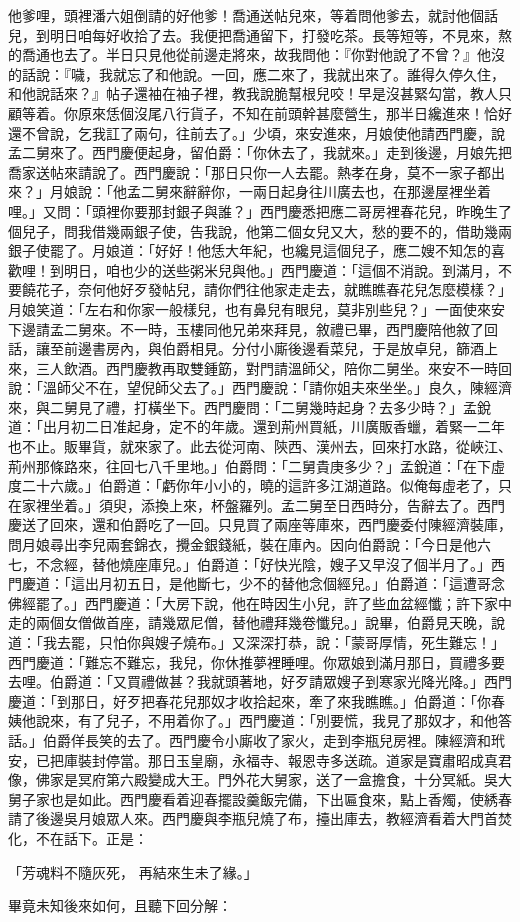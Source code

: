 \begin{showcontents}{}
他爹哩，頭裡潘六姐倒請的好他爹！喬通送帖兒來，等着問他爹去，就討他個話兒，到明日咱每好收拾了去。我便把喬通留下，打發吃茶。長等短等，不見來，熬的喬通也去了。半日只見他從前邊走將來，故我問他：『你對他說了不曾？』他沒的話說：『噦，我就忘了和他說。一回，應二來了，我就出來了。誰得久停久住，和他說話來？』帖子還袖在袖子裡，教我說脆幫根兒咬！早是沒甚緊勾當，教人只顧等着。你原來恁個沒尾八行貨子，不知在前頭幹甚麼營生，那半日纔進來！恰好還不曾說，乞我訌了兩句，往前去了。」少頃，來安進來，月娘使他請西門慶，說孟二舅來了。西門慶便起身，留伯爵：「你休去了，我就來。」走到後邊，月娘先把喬家送帖來請說了。西門慶說：「那日只你一人去罷。熱孝在身，莫不一家子都出來？」月娘說：「他孟二舅來辭辭你，一兩日起身往川廣去也，在那邊屋裡坐着哩。」又問：「頭裡你要那封銀子與誰？」西門慶悉把應二哥房裡春花兒，昨晚生了個兒子，問我借幾兩銀子使，告我說，他第二個女兒又大，愁的要不的，借助幾兩銀子使罷了。月娘道：「好好！他恁大年紀，也纔見這個兒子，應二嫂不知怎的喜歡哩！到明日，咱也少的送些粥米兒與他。」西門慶道：「這個不消說。到滿月，不要饒花子，奈何他好歹發帖兒，請你們往他家走走去，就瞧瞧春花兒怎麼模樣？」月娘笑道：「左右和你家一般樣兒，也有鼻兒有眼兒，莫非別些兒？」一面使來安下邊請孟二舅來。不一時，玉樓同他兄弟來拜見，敘禮已畢，西門慶陪他敘了回話，讓至前邊書房內，與伯爵相見。分付小廝後邊看菜兒，于是放卓兒，篩酒上來，三人飲酒。西門慶教再取雙鍾筯，對門請溫師父，陪你二舅坐。來安不一時回說：「溫師父不在，望倪師父去了。」西門慶說：「請你姐夫來坐坐。」良久，陳經濟來，與二舅見了禮，打橫坐下。西門慶問：「二舅幾時起身？去多少時？」孟銳道：「出月初二日准起身，定不的年歲。還到荊州買紙，川廣販香蠟，着緊一二年也不止。販畢貨，就來家了。此去從河南、陝西、漢州去，回來打水路，從峽江、荊州那條路來，往回七八千里地。」伯爵問：「二舅貴庚多少？」孟銳道：「在下虛度二十六歲。」伯爵道：「虧你年小小的，曉的這許多江湖道路。似俺每虛老了，只在家裡坐着。」須臾，添換上來，杯盤羅列。孟二舅至日西時分，告辭去了。西門慶送了回來，還和伯爵吃了一回。只見買了兩座等庫來，西門慶委付陳經濟裝庫，問月娘尋出李兒兩套錦衣，攪金銀錢紙，裝在庫內。因向伯爵說：「今日是他六七，不念經，替他燒座庫兒。」伯爵道：「好快光陰，嫂子又早沒了個半月了。」西門慶道：「這出月初五日，是他斷七，少不的替他念個經兒。」伯爵道：「這遭哥念佛經罷了。」西門慶道：「大房下說，他在時因生小兒，許了些血盆經懺；許下家中走的兩個女僧做首座，請幾眾尼僧，替他禮拜幾卷懺兒。」說畢，伯爵見天晚，說道：「我去罷，只怕你與嫂子燒布。」又深深打恭，說：「蒙哥厚情，死生難忘！」西門慶道：「難忘不難忘，我兒，你休推夢裡睡哩。你眾娘到滿月那日，買禮多要去哩。伯爵道：「又買禮做甚？我就頭著地，好歹請眾嫂子到寒家光降光降。」西門慶道：「到那日，好歹把春花兒那奴才收拾起來，牽了來我瞧瞧。」伯爵道：「你春姨他說來，有了兒子，不用着你了。」西門慶道：「別要慌，我見了那奴才，和他答話。」伯爵佯長笑的去了。西門慶令小廝收了家火，走到李瓶兒房裡。陳經濟和玳安，已把庫裝封停當。那日玉皇廟，永福寺、報恩寺多送疏。道家是寶肅昭成真君像，佛家是冥府第六殿變成大王。門外花大舅家，送了一盒擔食，十分冥紙。吳大舅子家也是如此。西門慶看着迎春擺設羹飯完備，下出匾食來，點上香燭，使綉春請了後邊吳月娘眾人來。西門慶與李瓶兒燒了布，擡出庫去，教經濟看着大門首焚化，不在話下。正是：

「芳魂料不隨灰死，  再結來生未了緣。」

畢竟未知後來如何，且聽下回分解：




\end{showcontents}


